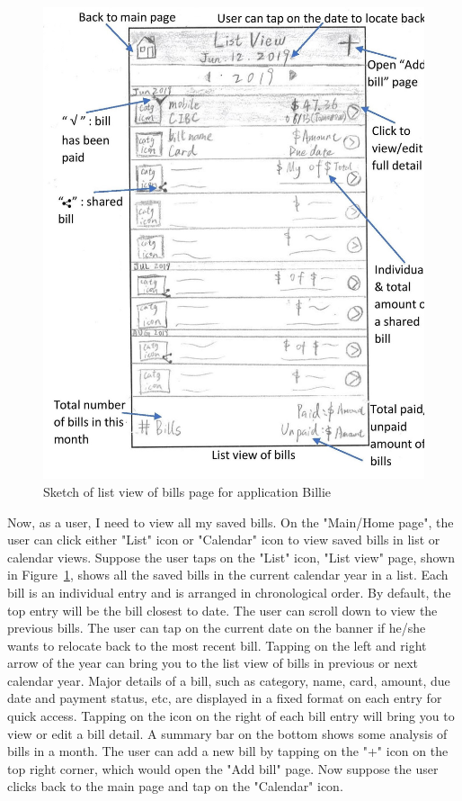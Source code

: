\documentclass{sigchi}
\begin{document}
\begin{figure}[h!]
\centering
  \includegraphics[width=0.6\columnwidth]{10-list-view-page.jpg}
  \caption{Sketch of list view of bills page for application Billie}
  \label{fig:figure25}
\end{figure}
Now, as a user, I need to view all my saved bills. On the "Main/Home page", the user can click either "List" icon or "Calendar" icon to view saved bills in list or calendar views. Suppose the user taps on the "List" icon, "List view" page, shown in Figure~\ref{fig:figure25}, shows all the saved bills in the current calendar year in a list. Each bill is an individual entry and is arranged in chronological order. By default, the top entry will be the bill closest to date. The user can scroll down to view the previous bills. The user can tap on the current date on the banner if he/she wants to relocate back to the most recent bill. Tapping on the left and right arrow of the year can bring you to the list view of bills in previous or next calendar year. Major details of a bill, such as category, name, card, amount, due date and payment status, etc, are displayed in a fixed format on each entry for quick access. Tapping on the icon on the right of each bill entry will bring you to view or edit a bill detail. A summary bar on the bottom shows some analysis of bills in a month. The user can add a new bill by tapping on the "+" icon on the top right corner, which would open the "Add bill" page. Now suppose the user clicks back to the main page and tap on the "Calendar" icon.
\end{document}
